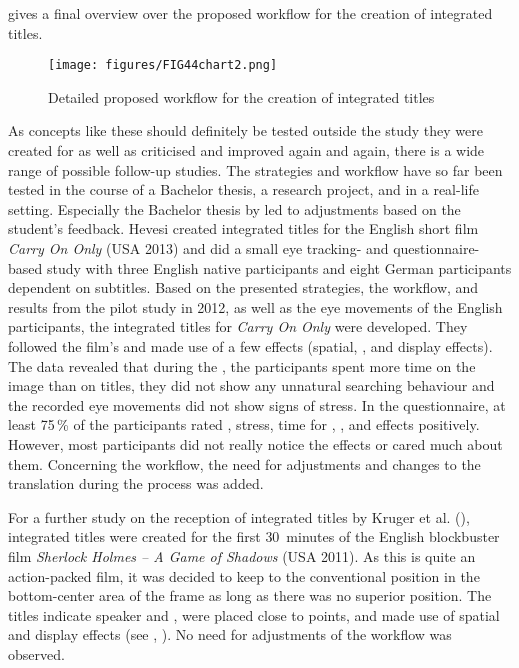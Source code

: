  gives a final overview over the proposed workflow for the creation of integrated titles.

\begin{figure}
\texttt{[image: figures/FIG44chart2.png]}
\caption{Detailed proposed workflow for the creation of integrated titles}
\label{fig:FIG44}
\end{figure}

As concepts like these should definitely be tested outside the study they were created for as well as criticised and improved again and again, there is a wide range of possible follow-up studies. The strategies and workflow have so far been tested in the course of a Bachelor thesis, a research project, and in a real-life setting. Especially the Bachelor thesis by \citet{Hevesi2015} led to adjustments based on the student’s feedback. Hevesi created integrated titles for the English short film \textit{Carry On Only} (USA 2013) and did a small eye tracking- and questionnaire-based study with three English native participants and eight German participants dependent on subtitles. Based on the presented  strategies, the workflow, and results from the pilot study in 2012, as well as the eye movements of the English participants, the integrated titles for \textit{Carry On Only} were developed. They followed the film’s  and made use of a few effects (spatial, , and display effects). The  data revealed that during the , the participants spent more time on the image than on titles, they did not show any unnatural searching behaviour and the recorded eye movements did not show signs of stress. In the questionnaire, at least 75\,\% of the participants rated , stress, time for , , and effects positively. However, most participants did not really notice the effects or cared much about them. Concerning the workflow, the need for adjustments and changes to the translation during the process was added.

For a further study on the reception of integrated titles by Kruger et al. (\citeyear{Kruger????b}), integrated titles were created for the first 30~minutes of the English blockbuster film \textit{Sherlock Holmes – A Game of Shadows} (USA 2011). As this is quite an action-packed film, it was decided to keep to the conventional position in the bottom-center area of the frame as long as there was no superior position. The titles indicate speaker and , were placed close to  points, and made use of spatial and display effects (see , \citealt{Kruger????b}). No need for adjustments of the workflow was observed.


